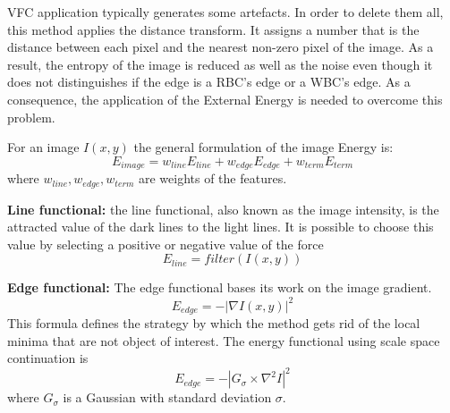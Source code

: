 \documentclass[final,a4paper,12pt,english]{UnicaPhdThesis3}
\begin{document}
	VFC application typically generates some artefacts. In order to delete them all, this method applies the distance transform. It assigns a number that is the distance between each pixel and the nearest non-zero pixel of the image. As a result, the entropy of the image is reduced as well as the noise even though it does not distinguishes if the edge is a RBC's edge or a WBC's edge. As a consequence, the application of the External Energy is needed to overcome this problem.
	
	For an image $I(x,y)$ the general formulation of the image Energy is:
	\begin{equation}
	E_{image}=w_{line}E_{line} + w_{edge}E_{edge} + w_{term}E_{term}
	\end{equation}
	where $w_{line}, w_{edge}, w_{term}$ are weights of the features.
	
	\textbf{Line functional:} the line functional, also known as the image intensity, is the attracted value of the dark lines to the light lines. It is possible to choose this value by selecting a positive or negative value of the force
	\begin{equation}
	E_{{line}}=filter(I(x,y))
	\end{equation}
	
	\textbf{Edge functional:} The edge functional bases its work on the image gradient.
	\begin{equation}
	E_{{edge}}=-\left|\nabla I(x,y)\right\vert ^{2}
	\end{equation}
	This formula defines the strategy by which the method gets rid of the local minima that are not object of interest. The energy functional using scale space continuation is
	\begin{equation}
	E_{edge}=-\left|G_{\sigma }\times\nabla ^{2}I\right\vert ^{2}
	\end{equation}
	where $ G_{\sigma } $ is a Gaussian with standard deviation $ \sigma $.
	
\end{document}
